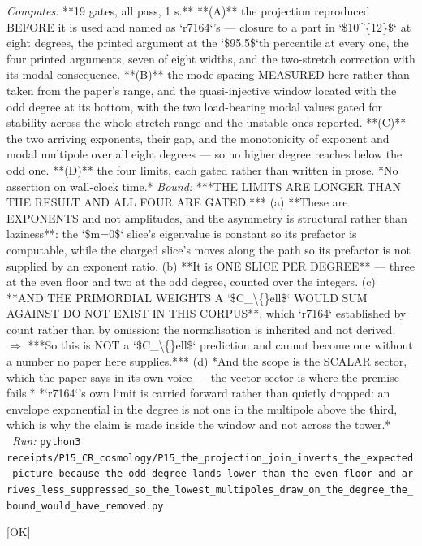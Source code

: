 \begin{description}
\emph{Computes:} **19 gates, all pass, 1 s.** **(A)** the projection reproduced BEFORE it is used and named as `r7164`'s --- closure to a part in `\$10\textasciicircum{}\{12\}\$` at eight degrees, the printed argument at the `\$95.5\$`th percentile at every one, the four printed arguments, seven of eight widths, and the two-stretch correction with its modal consequence. **(B)** the mode spacing MEASURED here rather than taken from the paper's range, and the quasi-injective window located with the odd degree at its bottom, with the two load-bearing modal values gated for stability across the whole stretch range and the unstable ones reported. **(C)** the two arriving exponents, their gap, and the monotonicity of exponent and modal multipole over all eight degrees --- so no higher degree reaches below the odd one. **(D)** the four limits, each gated rather than written in prose. *No assertion on wall-clock time.*
 \emph{Bound:}  ***THE LIMITS ARE LONGER THAN THE RESULT AND ALL FOUR ARE GATED.*** (a) **These are EXPONENTS and not amplitudes, and the asymmetry is structural rather than laziness**: the `\$m=0\$` slice's eigenvalue is constant so its prefactor is computable, while the charged slice's moves along the path so its prefactor is not supplied by an exponent ratio. (b) **It is ONE SLICE PER DEGREE** --- three at the even floor and two at the odd degree, counted over the integers. (c)  **AND THE PRIMORDIAL WEIGHTS A `\$C\_\textbackslash\{\}ell\$` WOULD SUM AGAINST DO NOT EXIST IN THIS CORPUS**, which `r7164` established by count rather than by omission: the normalisation is inherited and not derived. \ensuremath{\Rightarrow} ***So this is NOT a `\$C\_\textbackslash\{\}ell\$` prediction and cannot become one without a number no paper here supplies.*** (d) *And the scope is the SCALAR sector, which the paper says in its own voice --- the vector sector is where the premise fails.*  *`r7164`'s own limit is carried forward rather than quietly dropped: an envelope exponential in the degree is not one in the multipole above the third, which is why the claim is made inside the window and not across the tower.*
\ \emph{Run:} \texttt{python3 receipts/P15\_CR\_cosmology/P15\_the\_projection\_join\_inverts\_the\_expected\_picture\_because\_the\_odd\_degree\_lands\_lower\_than\_the\_even\_floor\_and\_arrives\_less\_suppressed\_so\_the\_lowest\_multipoles\_draw\_on\_the\_degree\_the\_bound\_would\_have\_removed.py}
\item[\label{rcpt:S2_the_quote_pin_backlog_falls_by_sixty_six_on_this_lines_own_two_receipts_and_every_verdict_names_what_was_read_and_the_re_check_it_owes}\textbf{}\quad\texttt{S2\_the\_quote\_pin\_backlog\_falls\_by\_sixty\_six\_on\_this\_lines\_own\_two\_receipts\_and\_every\_verdict\_names\_what\_was\_read\_and\_the\_re\_check\_it\_owes}]\hfill\textsf{[OK]}\\

\end{description}
